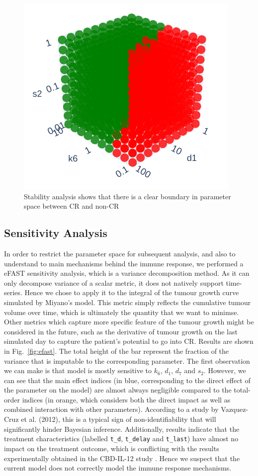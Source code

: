 \documentclass[11pt]{article}
\begin{document}
\begin{figure}[!ht]
    \centering\includegraphics[scale=0.5]{stability.png}
    \caption{Stability analysis shows that there is a clear boundary in parameter space between CR and non-CR}
    \label{fig:mcsa}
\end{figure}

\subsection{Sensitivity Analysis}
In order to restrict the parameter space for subsequent analysis, and also to understand to main mechanisms behind the immune response, we performed a eFAST sensitivity analysis, which is a variance decomposition method. As it can only decompose variance of a scalar metric, it does not natively support time-series. Hence we chose to apply it to the integral of the tumour growth curve simulated by Miyano's model. This metric simply reflects the cumulative tumour volume over time, which is ultimately the quantity that we want to minimse. Other metrics which capture more specific feature of the tumour growth might be considered in the future, such as the derivative of tumour growth on the last simulated day to capture the patient's potential to go into CR. Results are shown in Fig.~\ref{fig:efast}. The total height of the bar represent the fraction of the variance that is imputable to the corresponding parameter. The first observation we can make is that model is mostly sensitive to $k_6$, $d_1$, $d_7$ and $s_2$. However, we can see that the main effect indices (in blue, corresponding to the direct effect of the parameter on the model) are almost always negligible compared to the total-order indices (in orange, which considers both the direct impact as well as combined interaction with other parameters). According to a study by Vazquez-Cruz et al. (2012), this is a typical sign of non-identifiability \cite{tomgro} that will significantly hinder Bayesian inference. Additionally, results indicate that the treatment characteristics (labelled \verb+t_d+, \verb+t_delay+ and \verb+t_last+) have almost no impact on the treatment outcome, which is conflicting with the results experimentally obtained in the CBD-IL-12 study \cite{cbdil12}. Hence we suspect that the current model does not correctly model the immune response mechanisms. 
\end{document}
